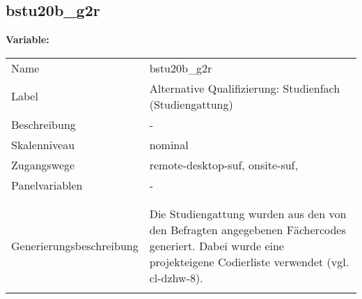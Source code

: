 	
	
	\subsection{bstu20b\_g2r}
	\label{subSection:bstu20b_g2r}

	\noindent\textbf{Variable:}\\
		\begin{tabular}{lL{11.3cm}}
			\label{tableVariable:bstu20b_g2r}
			Name & bstu20b\_g2r \\
			Label & Alternative Qualifizierung: Studienfach (Studiengattung) \\
			Beschreibung & - \\
			Skalenniveau & nominal \\
			Zugangswege &
				remote-desktop-suf,
				onsite-suf,
 \\
			Panelvariablen & -
			 \\
			 \\
 \\
					Generierungsbeschreibung & Die Studiengattung wurden aus den von den Befragten angegebenen Fächercodes generiert.  Dabei wurde eine projekteigene Codierliste verwendet (vgl. cl-dzhw-8).
				 \\	
			 \\
		\end{tabular}






